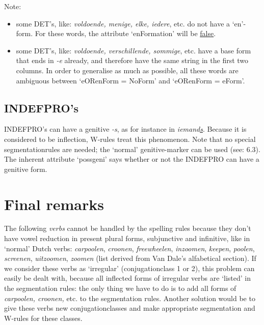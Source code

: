 Note: 

\begin{itemize}

  \item some DET's, like: {\em voldoende, menige, elke, iedere}, etc. do 
        not have a `en'-form. For these words, the attribute 
        `enFormation' will be \underline{false}.

  \item some DET's, like: {\em voldoende, verschillende, sommige}, etc. have a 
        base form that ends in {\em -e} already, and therefore have the same 
        string in the first two columns. In order to generalise as much as 
        possible, all these words are ambiguous between `eORenForm = 
        NoForm' and `eORenForm = eForm'.

\end{itemize}


\subsection{INDEFPRO's}

INDEFPRO's can have a genitive {\em -s}, as for instance in 
{\em iemand\underline{s}}.
Because
it is considered to be inflection, W-rules treat this phenomenon.
Note that no special segmentationrules are needed; the `normal' genitive-marker 
can be used (see: 6.3). The inherent attribute `possgeni' says whether or not
the INDEFPRO can have a genitive form.

\newpage

\section{Final remarks}

The following {\em verbs} cannot be handled by the spelling rules because
they don't have vowel reduction in present plural forms, subjunctive and 
infinitive, like in `normal' Dutch verbs: {\em carpoolen}, {\em croonen}, 
{\em freewheelen}, {\em inzoomen}, {\em keepen}, {\em poolen}, {\em screenen},
{\em uitzoomen}, {\em zoomen} (list derived from Van Dale's alfabetical 
section). 
If we consider these verbs as `irregular' (conjugationclass 1 or 2), this
problem can easily be dealt with, because all inflected forms of irregular
verbs are `listed' in the segmentation rules: the only thing we have to do is 
to add all forms of {\em carpoolen, croonen,} etc. to the segmentation rules.
Another solution would be to give these verbs new conjugationclasses and make 
appropriate segmentation and W-rules for these classes.

